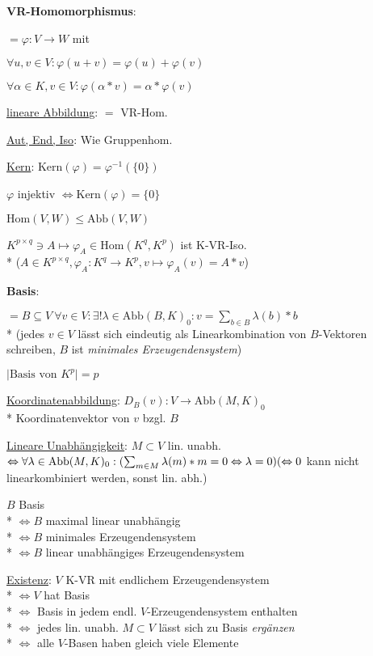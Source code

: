 \textbf{VR-Homomorphismus}:
\begin{items}
	\item $= \varphi: V \rightarrow W$ mit
	\begin{enumeration}
		\item $\forall u,v \in V: \varphi(u+v) = \varphi(u)+\varphi(v)$
		\item $\forall \alpha \in K, v \in V: \varphi(\alpha*v)=\alpha*\varphi(v)$
	\end{enumeration}
	\item \underline{lineare Abbildung}: $=$ VR-Hom.
	\item \underline{Aut, End, Iso}: Wie Gruppenhom.
	\item \underline{Kern}: $\text{Kern}(\varphi)=\varphi^{-1}(\{ 0 \})$
	\item $\varphi$ injektiv $\Leftrightarrow \text{Kern}(\varphi) = \{ 0 \}$
	\item $\text{Hom}(V,W) \leq \text{Abb}(V,W)$
	\item $K^{p \times q} \ni A \mapsto \varphi_A \in \text{Hom}(K^q, K^p)$ ist K-VR-Iso. \\* ($A \in K^{p \times q}, \varphi_A: K^q \rightarrow K^p, v \mapsto \varphi_A(v)=A*v $)
\end{items}

\textbf{Basis}:
\begin{items}
	\item $=B \subseteq V \ \forall v \in V: \exists ! \lambda \in \text{Abb}(B,K)_0:  v=\sum_{b \in B} \lambda(b)*b$ \\* (jedes $v \in V$ lässt sich eindeutig als Linearkombination von $B$-Vektoren schreiben, $B$ ist \emph{minimales Erzeugendensystem})
	\item $\mid \text{Basis von } K^p \mid = p$
	\item \underline{Koordinatenabbildung}: $D_B(v): V \rightarrow \text{Abb}(M,K)_0$ \\* Koordinatenvektor von $v$ bzgl. $B$
	\item \underline{Lineare Unabhängigkeit}: $M \subset V$ lin. unabh. $\\* \Leftrightarrow \forall \lambda \in \text{Abb}(M,K)_0: (\sum_{m \in M} \lambda(m)*m=0 \Leftrightarrow \lambda = 0) \\* (\Leftrightarrow 0$ kann nicht linearkombiniert werden, sonst lin. abh.)
	\item $B$ Basis \\* $\Leftrightarrow B$ maximal linear unabhängig \\* $\Leftrightarrow B$ minimales Erzeugendensystem \\* $\Leftrightarrow B$ linear unabhängiges Erzeugendensystem
	\item \underline{Existenz}: $V$ K-VR mit endlichem Erzeugendensystem \\* $\Leftrightarrow V$ hat Basis \\* $\Leftrightarrow$ Basis in jedem endl. $V$-Erzeugendensystem enthalten \\* $\Leftrightarrow$ jedes lin. unabh. $M \subset V$ lässt sich zu Basis \emph{ergänzen} \\* $\Leftrightarrow$ alle $V$-Basen haben gleich viele Elemente
\end{items}

